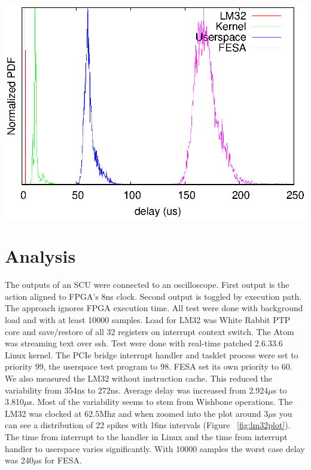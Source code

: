 \documentclass[25pt,halfparskip-,pagesize]{scrartcl}
\begin{document}
\begin{multicols*}{3}
\includegraphics[width=\columnwidth]{../images/WEPD48f1}
\label{fig:delaycomparison}

\columnbreak

\section{Analysis}
The outputs of an SCU were connected to an oscilloscope.
First output is the action aligned to FPGA's 8ns clock.
Second output is toggled by execution path. The approach
ignores FPGA execution time.
All test were done with background load and with at least
10000 samples. Load for LM32 was White Rabbit PTP core and
save/restore of all 32 registers on interrupt context switch.
The Atom was streaming text over ssh.
Test were done with real-time patched 2.6.33.6 Linux kernel.
The PCIe bridge interrupt handler and tasklet process were
set to priority 99, the userspace test program to 98. FESA
set its own priority to 60.
We also measured the LM32 without instruction cache. This reduced
the variability from 354ns to 272ns. Average delay was increased
from 2.924$\mu$s to 3.810$\mu$s. Most of the variability seems
to stem from Wishbone operations.
The LM32 was clocked at 62.5Mhz and when zoomed into the plot
around 3$\mu$s you can see a distribution of 22 spikes with 16ns
intervals (Figure ~\ref{fig:lm32plot}).
The time from interrupt to the handler in Linux and the time
from interrupt handler to userspace varies significantly.
With 10000 samples the worst case delay was 240$\mu$s for FESA.


\end{multicols*}
\end{document}
